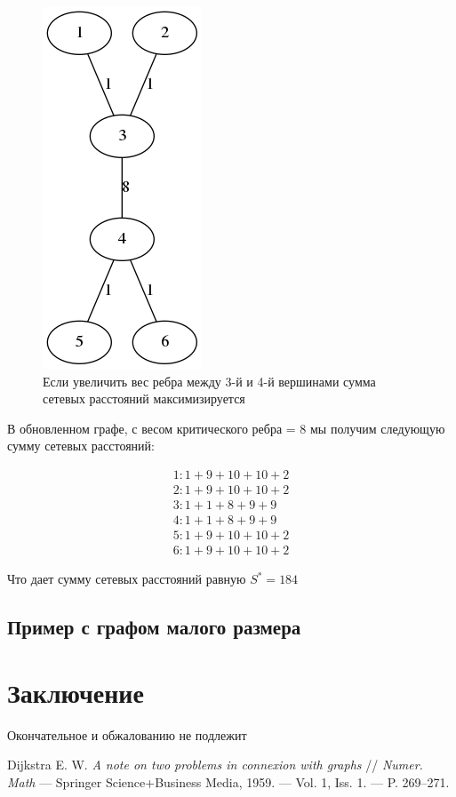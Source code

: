 \documentclass[12pt]{article}
\begin{document}
\begin{figure}[h]
    \centering
    \includegraphics[scale=0.7]{min_graph_8.png}
    \caption{Если увеличить вес ребра между 3-й и 4-й вершинами сумма сетевых расстояний максимизируется}
    \label{fig:min_graph_8}
\end{figure}

В обновленном графе, с весом критического ребра = 8 мы получим следующую
сумму сетевых расстояний:

\begin{gather}
1 : 1 + 9 + 10 + 10 + 2 \\
2 : 1 + 9 + 10 + 10 + 2 \\
3 : 1 + 1 + 8  + 9  + 9 \\
4 : 1 + 1 + 8  + 9  + 9 \\
5 : 1 + 9 + 10 + 10 + 2 \\
6 : 1 + 9 + 10 + 10 + 2
\end{gather}

Что дает сумму сетевых расстояний равную $S^* = 184$

\subsection{Пример с графом малого размера}

\section{Заключение}
Окончательное и обжалованию не подлежит

\begin{thebibliography}{9}
Dijkstra E. W. \textit{A note on two problems in connexion with graphs} //
\textit{Numer. Math} — Springer Science+Business Media, 1959.
— Vol. 1, Iss. 1. — P. 269–271.
\end{thebibliography}
\end{document}

